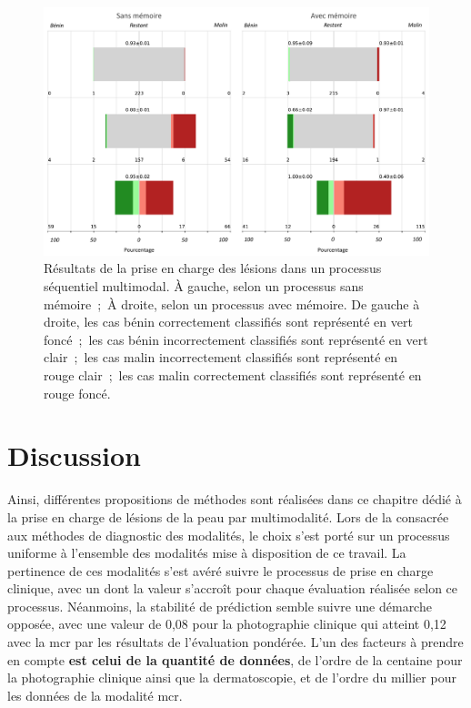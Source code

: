 \begin{figure}[H]
    \centering
    \includegraphics[width=0.9\linewidth]{contents/chapter_8/resources/results_lesions_management.pdf}
    \caption{Résultats de la prise en charge des lésions dans un processus séquentiel multimodal. À gauche, selon un processus sans mémoire~;~À droite, selon un processus avec mémoire. De gauche à droite, les cas bénin correctement classifiés sont représenté en vert foncé~;~les cas bénin incorrectement classifiés sont représenté en vert clair~;~les cas malin incorrectement classifiés sont représenté en rouge clair~;~les cas malin correctement classifiés sont représenté en rouge foncé.}
    \label{fig:results_lesions_management}
\end{figure}\par

\section{Discussion}
Ainsi, différentes propositions de méthodes sont réalisées dans ce chapitre dédié à la prise en charge de lésions de la peau par multimodalité. Lors de la  consacrée aux méthodes de diagnostic des modalités, le choix s'est porté sur un processus uniforme à l'ensemble des modalités mise à disposition de ce travail. La pertinence de ces modalités s'est avéré suivre le processus de prise en charge clinique, avec un \fscore{} dont la valeur s'accroît pour chaque évaluation réalisée selon ce processus. Néanmoins, la stabilité de prédiction semble suivre une démarche opposée, avec une valeur de 0,08 pour la photographie clinique qui atteint 0,12 avec la \gls{mcr} par les résultats de l'évaluation pondérée. L'un des facteurs à prendre en compte \textbf{est celui de la quantité de données}, de l'ordre de la centaine pour la photographie clinique ainsi que la dermatoscopie, et de l'ordre du millier pour les données de la modalité \gls{mcr}.\par

